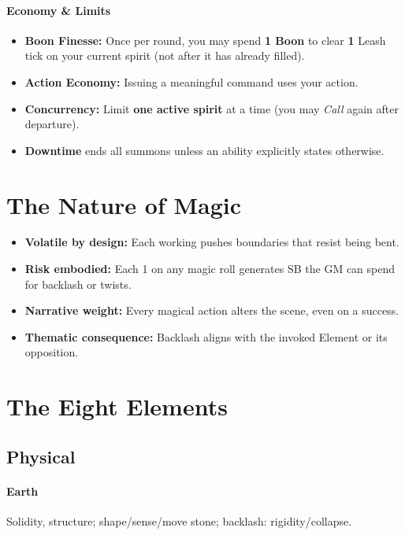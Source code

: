\paragraph{Economy \& Limits}
\begin{itemize}
  \item \textbf{Boon Finesse:} Once per round, you may spend \textbf{1 Boon} to clear \textbf{1} Leash tick on your current spirit (not after it has already filled).
  \item \textbf{Action Economy:} Issuing a meaningful command uses your action.
  \item \textbf{Concurrency:} Limit \textbf{one active spirit} at a time (you may \emph{Call} again after departure).
  \item \textbf{Downtime} ends all summons unless an ability explicitly states otherwise.
\end{itemize}

\section{The Nature of Magic}
\label{sec:nature-of-magic}

\begin{itemize}
\item \textbf{Volatile by design:} Each working pushes boundaries that resist being bent.
\item \textbf{Risk embodied:} Each 1 on any magic roll generates SB the GM can spend for backlash or twists.
\item \textbf{Narrative weight:} Every magical action alters the scene, even on a success.
\item \textbf{Thematic consequence:} Backlash aligns with the invoked Element or its opposition.
\end{itemize}

\section{The Eight Elements}
\label{sec:eight-elements}

\subsection{Physical}
\paragraph{Earth} Solidity, structure; shape/sense/move stone; backlash: rigidity/collapse. \quad

